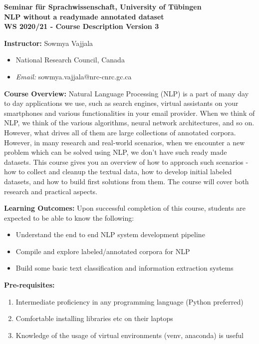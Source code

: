 \documentclass[11pt,a4paper]{article}
\begin{document}
\begin{center}
  \textbf{Seminar f\"ur Sprachwissenschaft, University of T\"ubingen\\[3ex]
  {\Large NLP without a readymade annotated dataset}\\[3ex]
  WS 2020/21 - Course Description Version 3
}
\end{center}

\bigskip
\textbf{\large Instructor:}
  Sowmya Vajjala
  \begin{itemize}\vspace*{-.4\baselineskip}\itemsep-.4ex
\item National Research Council, Canada
  \item \textit{Email:} sowmya.vajjala@nrc-cnrc.gc.ca
\end{itemize}

\textbf{\large Course Overview:}
Natural Language Processing (NLP) is a part of many day to day applications we use, such as search engines, virtual assistants on your smartphones and various functionalities in your email provider. When we think of NLP, we think of the various algorithms, neural network architectures, and so on. However, what drives all of them are large collections of annotated corpora. However, in many research and real-world scenarios, when we encounter a new problem which can be solved using NLP, we don't have such ready made datasets. This course gives you an overview of how to approach such scenarios - how to collect and cleanup the textual data, how to develop initial labeled datasets, and how to build first solutions from them. The course will cover both research and practical aspects. 

\textbf{\large Learning Outcomes:} Upon successful completion of this course, students are expected to be able to know the following:
\begin{itemize}
\item Understand the end to end NLP system development pipeline
\item Compile and explore labeled/annotated corpora for NLP
\item Build some basic text classification and information extraction systems
\end{itemize}

\textbf{\large Pre-requisites:}
\begin{enumerate}
\item Intermediate proficiency in any programming language (Python preferred)
\item Comfortable installing libraries etc on their laptops
\item Knowledge of the usage of virtual environments (venv, anaconda) is useful
\end{enumerate}
\end{document}
